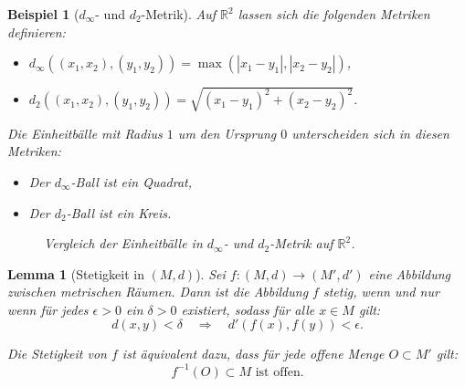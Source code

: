 \documentclass[a4paper,12pt]{article}
\theoremstyle{break}
\newtheorem{example}[definition]{Beispiel}
\newtheorem{lemma}[definition]{Lemma}
\begin{document}
\begin{example}[$d_\infty$- und $d_2$-Metrik]
Auf $\mathbb{R}^2$ lassen sich die folgenden Metriken definieren:
\begin{itemize}
    \item $d_\infty((x_1, x_2), (y_1, y_2)) = \max(|x_1 - y_1|, |x_2 - y_2|)$,
    \item $d_2((x_1, x_2), (y_1, y_2)) = \sqrt{(x_1 - y_1)^2 + (x_2 - y_2)^2}$.
\end{itemize}
Die Einheitbälle mit Radius $1$ um den Ursprung $0$ unterscheiden sich in diesen Metriken:
\begin{itemize}
    \item Der $d_\infty$-Ball ist ein Quadrat,
    \item Der $d_2$-Ball ist ein Kreis.
\end{itemize}

\begin{figure}[h!]
    \centering
    \caption{Vergleich der Einheitbälle in $d_\infty$- und $d_2$-Metrik auf $\mathbb{R}^2$.}
    \label{fig:metric_balls}
\end{figure}
\end{example}



\begin{lemma}[Stetigkeit in $(M,d)$]

Sei $f : (M, d) \to (M', d')$ eine Abbildung zwischen metrischen Räumen. Dann ist die Abbildung $f$ stetig, wenn und nur wenn für jedes $\epsilon > 0$ ein $\delta > 0$ existiert, sodass für alle $x \in M$ gilt:
\[
d(x, y) < \delta \quad \Rightarrow \quad d'(f(x), f(y)) < \epsilon.
\]

Die Stetigkeit von $f$ ist äquivalent dazu, dass für jede offene Menge $O \subset M'$ gilt:
\[
f^{-1}(O) \subset M \text{ ist offen}.
\]
\end{lemma}
\end{document}
